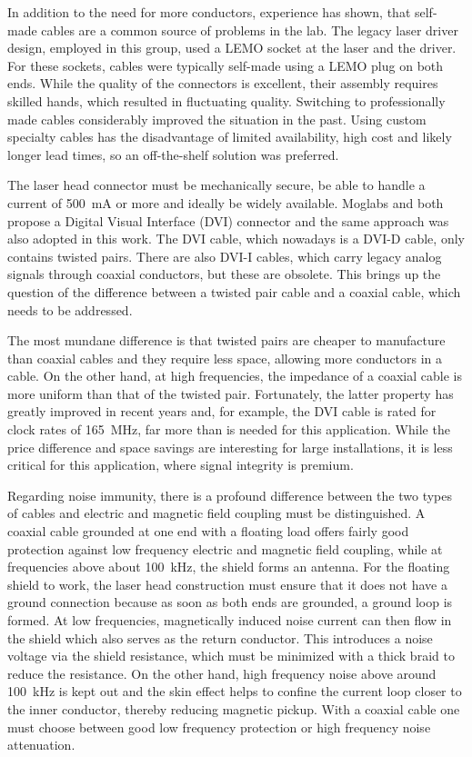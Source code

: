 In addition to the need for more conductors, experience has shown, that self-made cables are a common source of problems in the lab. The legacy laser driver design, employed in this group, used a LEMO  socket at the laser and the driver. For these sockets, cables were typically self-made using a LEMO  plug on both ends. While the quality of the connectors is excellent, their assembly requires skilled hands, which resulted in fluctuating quality. Switching to professionally made cables considerably improved the situation in the past. Using custom specialty cables has the disadvantage of limited availability, high cost and likely longer lead times, so an off-the-shelf solution was preferred.

The laser head connector must be mechanically secure, be able to handle a current of \qty{500}{\mA} or more and ideally be widely available. Moglabs and \citeauthor{laser_driver_digital_update} \cite{laser_driver_digital_update} both propose a Digital Visual Interface (DVI) connector and the same approach was also adopted in this work. The DVI cable, which nowadays is a DVI-D cable, only contains twisted pairs. There are also DVI-I cables, which carry legacy analog signals through coaxial conductors, but these are obsolete. This brings up the question of the difference between a twisted pair cable and a coaxial cable, which needs to be addressed.

The most mundane difference is that twisted pairs are cheaper to manufacture than coaxial cables and they require less space, allowing more conductors in a cable. On the other hand, at high frequencies, the impedance of a coaxial cable is more uniform than that of the twisted pair. Fortunately, the latter property has greatly improved in recent years and, for example, the DVI cable is rated for clock rates of \qty{165}{\MHz}, far more than is needed for this application. While the price difference and space savings are interesting for large installations, it is less critical for this application, where signal integrity is premium.

Regarding noise immunity, there is a profound difference between the two types of cables and electric and magnetic field coupling must be distinguished. A coaxial cable grounded at one end with a floating load offers fairly good protection against low frequency electric and magnetic field coupling, while at frequencies above about \qty{100}{\kHz}, the shield forms an antenna. For the floating shield to work, the laser head construction must ensure that it does not have a ground connection because as soon as both ends are grounded, a ground loop is formed. At low frequencies, magnetically induced noise current can then flow in the shield which also serves as the return conductor. This introduces a noise voltage via the shield resistance, which must be minimized with a thick braid to reduce the resistance. On the other hand, high frequency noise above around \qty{100}{\kHz} is kept out and the skin effect helps to confine the current loop closer to the inner conductor, thereby reducing magnetic pickup. With a coaxial cable one must choose between good low frequency protection or high frequency noise attenuation.

